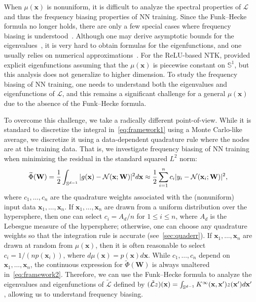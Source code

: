 \documentclass{article} %
\begin{document}
When $\mu(\mathbf{x})$ is nonuniform, it is difficult to analyze the spectral properties of $\mathcal{L}$ and thus the frequency biasing properties of NN training. Since the Funk--Hecke formula no longer holds, there are only a few special cases where frequency biasing is understood~\cite[Sec.~4.3]{williams2006gaussian}. Although one may derive asymptotic bounds for the eigenvalues~\citep{widom1963asymptotic,widom1964asymptotic,bach2002kernel}, it is very hard to obtain formulas for the eigenfunctions, and one usually relies on numerical approximations~\citep{baker1977numerical}.  For the ReLU-based NTK, \citep{basri2020frequency} provided explicit eigenfunctions assuming that the $\mu(\mathbf{x})$ is piecewise constant on $\mathbb{S}^1$, but this analysis does not generalize to higher dimension. To study the frequency biasing of NN training, one needs to understand both the eigenvalues and eigenfunctions of $\mathcal{L}$, and this remains a significant challenge for a general $\mu(\mathbf{x})$ due to the absence of the Funk--Hecke formula.

To overcome this challenge, we take a radically different point-of-view. While it is standard to discretize the integral in~\cref{eq:framework1} using a Monte Carlo-like average, we discretize it using a data-dependent quadrature rule where the nodes are at the training data. That is, we investigate frequency biasing of NN training when minimizing the residual in the standard squared $L^2$ norm: 
\begin{equation}\label{eq:framework2}
    \widetilde \Phi(\mathbf{W}) = \frac{1}{2}   \int_{{\mathbb{S}}^{d-1}}  | g(\mathbf{x}) - {\mathcal{N}}(\mathbf{x};\mathbf{W})|^2 d\mathbf{x} \approx \frac{1}{2} \sum_{i=1}^n  c_i |y_i - {\mathcal{N}}(\mathbf{x}_i;\mathbf{W})|^2,
\end{equation}
where $c_1,\ldots,c_n$ are the quadrature weights associated with the (nonuniform) input data $\mathbf{x}_1,\ldots,\mathbf{x}_n$. If $\mathbf{x}_1,\ldots,\mathbf{x}_n$ are drawn from a uniform distribution over the hypersphere, then one can select $c_i = A_d/n$ for $1\leq i\leq n$, where $A_d$ is the Lebesgue measure of the hypersphere; otherwise, one can choose any quadrature weights so that the integration rule is accurate (see~\cref{sec:quaderr}). If $\mathbf{x}_1,\ldots,\mathbf{x}_n$ are drawn at random from $\mu(\mathbf{x})$, then it is often reasonable to select $c_i = 1/(n p(\mathbf{x}_i))$, where $d\mu(\mathbf{x}) = p(\mathbf{x}) d\mathbf{x}$. While $c_1,\ldots,c_n$ depend on $\mathbf{x}_1,\ldots,\mathbf{x}_n$, the continuous expression for $\widetilde \Phi(\mathbf{W})$ is always unaltered in~\cref{eq:framework2}. Therefore, we can use the Funk--Hecke formula to analyze the eigenvalues and eigenfunctions of $\tilde{\mathcal{L}}$ defined by $(\tilde{\mathcal{L}} z)(\mathbf{x}) = \int_{{\mathbb{S}}^{d-1}} K^\infty(\mathbf{x},\mathbf{x}') z(\mathbf{x}') d\mathbf{x}'$, allowing us to understand frequency biasing.
\end{document}

